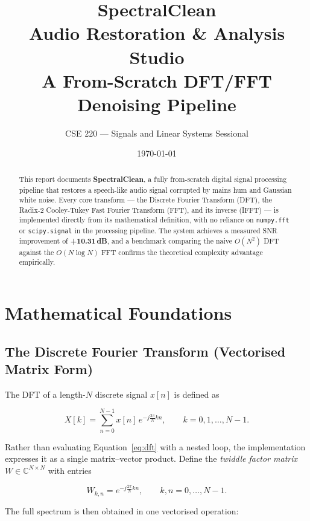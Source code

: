 \documentclass[11pt]{article}
\title{\vspace{-1.5cm}\textbf{SpectralClean}\\[0.3em]
\Large Audio Restoration \& Analysis Studio\\[0.2em]
\normalsize A From-Scratch DFT/FFT Denoising Pipeline}
\author{CSE 220 --- Signals and Linear Systems Sessional}
\date{\today}
\begin{document}
\maketitle
\thispagestyle{fancy}

\begin{abstract}
\noindent
This report documents \textbf{SpectralClean}, a fully from-scratch digital signal
processing pipeline that restores a speech-like audio signal corrupted by mains
hum and Gaussian white noise. Every core transform --- the Discrete Fourier
Transform (DFT), the Radix-2 Cooley-Tukey Fast Fourier Transform (FFT), and its
inverse (IFFT) --- is implemented directly from its mathematical definition, with
no reliance on \texttt{numpy.fft} or \texttt{scipy.signal} in the processing
pipeline. The system achieves a measured SNR improvement of
\textbf{+10.31\,dB}, and a benchmark comparing the naive $O(N^2)$ DFT against
the $O(N\log N)$ FFT confirms the theoretical complexity advantage empirically.
\end{abstract}

\section{Mathematical Foundations}

\subsection{The Discrete Fourier Transform (Vectorised Matrix Form)}

The DFT of a length-$N$ discrete signal $x[n]$ is defined as

\begin{equation}
X[k] = \sum_{n=0}^{N-1} x[n] \, e^{-j \frac{2\pi}{N} kn}, \qquad k = 0, 1, \dots, N-1.
\label{eq:dft}
\end{equation}

Rather than evaluating Equation~\ref{eq:dft} with a nested loop, the
implementation expresses it as a single matrix--vector product. Define the
\emph{twiddle factor matrix} $W \in \mathbb{C}^{N \times N}$ with entries

\begin{equation}
W_{k,n} = e^{-j \frac{2\pi}{N} kn}, \qquad k,n = 0,\dots,N-1.
\label{eq:twiddle-matrix}
\end{equation}

The full spectrum is then obtained in one vectorised operation:
\end{document}

